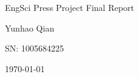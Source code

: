 \documentclass[../main.tex]{subfiles}
\begin{document}
\centering

\vspace*{1.5in}

\begin{Huge}
	EngSci Press Project Final Report
\end{Huge}

\vspace{1in}

\begin{Large}
	Yunhao Qian
\end{Large}

\vspace{0.3in}

\begin{Large}
	SN: 1005684225
\end{Large}

\vspace{\fill}

\begin{Large}
	\today
\end{Large}

\vspace*{1.5in}
\end{document}
